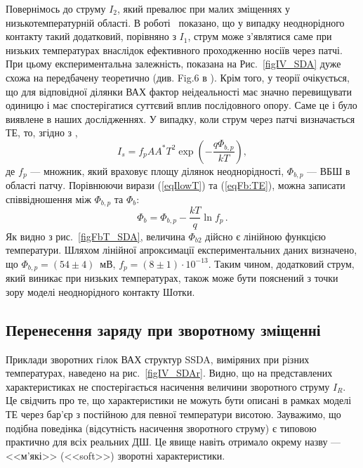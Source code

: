 Повернімось до струму $I_2$, який превалює при малих зміщеннях у низькотемпературній області.
В роботі~\cite{Tung:PhysRev} показано, що у випадку неоднорідного контакту такий додатковий, порівняно з $I_1$, струм
може з'являтися саме при низьких температурах внаслідок ефективного проходженню носіїв через патчі.
При цьому експериментальна залежність, показана на Рис.~\ref{figIV_SDA} дуже схожа на передбачену теоретично (див. Fig.6 в \cite{Tung:PhysRev}).
Крім того, у теорії очікується, що для відповідної ділянки ВАХ фактор неідеальності має значно перевищувати одиницю
і має спостерігатися суттєвий вплив послідовного опору.
Саме це і було виявлене в наших дослідженнях.
У випадку, коли струм через патчі визначається ТЕ, то, згідно з \cite{Sarpatwari, Tung:PhysRev},
\begin{equation}\label{eqIlowT}
I_s=f_pAA^*T^2\exp\left(-\frac{q\Phi_{b,p}}{kT}\right),
\end{equation}
де
$f_p$  --- множник, який враховує площу ділянок неоднорідності,
$\Phi_{b,p}$ --- ВБШ в області патчу.
Порівнюючи вирази (\ref{eqIlowT}) та (\ref{eqFb:TE}), можна
записати співвідношення між $\Phi_{b,p}$ та $\Phi_{b}$:
\begin{equation}\label{eqFbFbp}
\Phi_b=\Phi_{b,p}-\frac{kT}{q}\ln{f_p}\,.
\end{equation}
Як видно з рис.~\ref{figFbT_SDA}, величина $\Phi_{b2}$ дійсно є лінійною функцією температури.
Шляхом лінійної апроксимації експериментальних даних визначено, що $\Phi_{b,p}=(54\pm4)$~мВ,
$f_p=(8\pm1)\cdot10^{-13}$.
Таким чином, додатковий струм, який виникає при низьких температурах, також може бути пояснений з точки
зору моделі неоднорідного контакту Шотки.

\subsection{Перенесення заряду при зворотному зміщенні}

Приклади зворотних гілок ВАХ структур SSDA, виміряних при різних температурах, наведено на рис.~\ref{figIV_SDAr}.
Видно, що на представлених характеристиках не спостерігається насичення величини зворотного струму $I_R$.
Це свідчить про те,
що характеристики не можуть бути описані в рамках моделі ТЕ через бар'єр з постійною для певної температури висотою.
Зауважимо, що подібна поведінка (відсутність насичення зворотного струму) є типовою
практично для всіх реальних ДШ.
Це явище навіть отримало окрему назву --- <<м'які>> (<<soft>>) зворотні характеристики.

